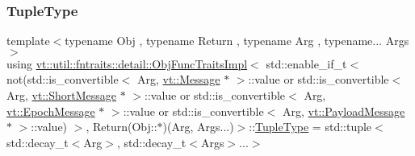 \subsubsection{\texorpdfstring{Tuple\+Type}{TupleType}}
{\footnotesize\ttfamily template$<$typename Obj , typename Return , typename Arg , typename... Args$>$ \\
using \hyperlink{structvt_1_1util_1_1fntraits_1_1detail_1_1_obj_func_traits_impl}{vt\+::util\+::fntraits\+::detail\+::\+Obj\+Func\+Traits\+Impl}$<$ std\+::enable\+\_\+if\+\_\+t$<$ not(std\+::is\+\_\+convertible$<$ Arg, \hyperlink{namespacevt_a3a3ddfef40b4c90915fa43cdd5f129ea}{vt\+::\+Message} $\ast$ $>$\+::value or std\+::is\+\_\+convertible$<$ Arg, \hyperlink{namespacevt_a1125ac1da6c0bbf141e0ea0739d7602d}{vt\+::\+Short\+Message} $\ast$ $>$\+::value or std\+::is\+\_\+convertible$<$ Arg, \hyperlink{namespacevt_ad67368ffae52d7325002586b41bb150e}{vt\+::\+Epoch\+Message} $\ast$ $>$\+::value or std\+::is\+\_\+convertible$<$ Arg, \hyperlink{namespacevt_a89a92229c5622b855c02c549f83a1a68}{vt\+::\+Payload\+Message} $\ast$ $>$\+::value) $>$, Return(Obj\+::$\ast$)(Arg, Args...)$>$\+::\hyperlink{structvt_1_1util_1_1fntraits_1_1detail_1_1_obj_func_traits_impl_3_01std_1_1enable__if__t_3_01not1219121971b8d08f950169835519afd3_aac475dfbd9d153be1039d57eaf8ef934}{Tuple\+Type} =  std\+::tuple$<$std\+::decay\+\_\+t$<$Arg$>$, std\+::decay\+\_\+t$<$Args$>$...$>$}



